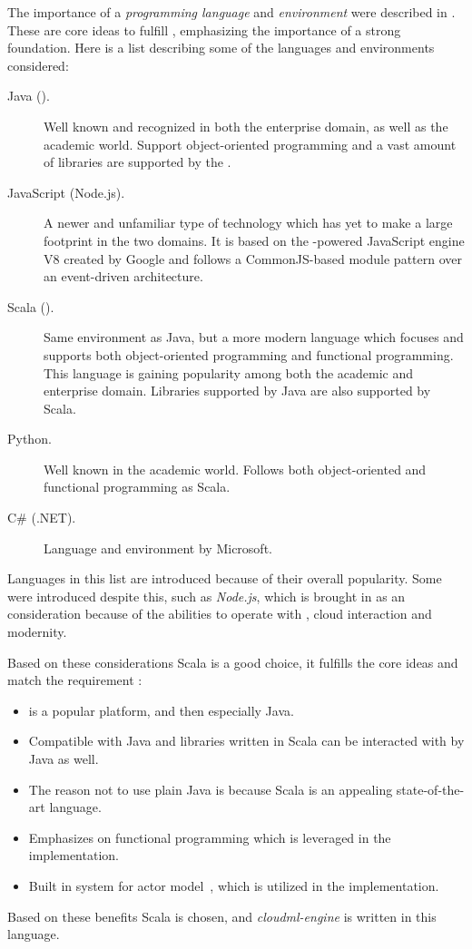 The importance of a \emph{programming language} and \emph{environment} were
described in .
These are core ideas to fulfill , emphasizing the importance of a strong foundation.
Here is a list describing some of the languages and environments considered:
\begin{description}
  \item[Java ().] Well known and recognized in both the enterprise domain, as well as the academic world.
    Support object-oriented programming and a vast amount of libraries are supported by the .
  \item[JavaScript (Node.js).] A newer and unfamiliar type of technology which has yet to 
    make a large footprint in the two domains. 
    It is based on the -powered JavaScript engine V8 created by Google and follows a 
    CommonJS-based module pattern over an event-driven architecture.
  \item[Scala ().] Same environment as Java, 
    but a more modern language which focuses and supports both 
    object-oriented programming and functional programming.
    This language is gaining popularity among both the academic and enterprise domain.
    Libraries supported by Java are also supported by Scala.
  \item[Python.] Well known in the academic world. Follows both object-oriented and functional programming as
    Scala.
  \item[C\# (.NET).] Language and environment by Microsoft.
\end{description}
Languages in this list are introduced because of their overall popularity.
Some were introduced despite this, such as \emph{Node.js}, 
which is brought in as an consideration because of the abilities to operate
with , cloud interaction and modernity.

Based on these considerations Scala is a good choice, it fulfills the core ideas and match
the requirement :
\begin{itemize} 
  \item {} is a popular platform, and then especially Java.
  \item Compatible with Java and libraries written in Scala can be interacted with by Java as well.
  \item The reason not to use plain Java is because Scala is an appealing state-of-the-art language.
  \item Emphasizes on functional programming which is leveraged in the implementation.
  \item Built in system for actor model~\cite{actors:haller07}, which is utilized in the implementation.
\end{itemize}
Based on these benefits Scala is chosen, and \emph{cloudml-engine} is written in this language.

